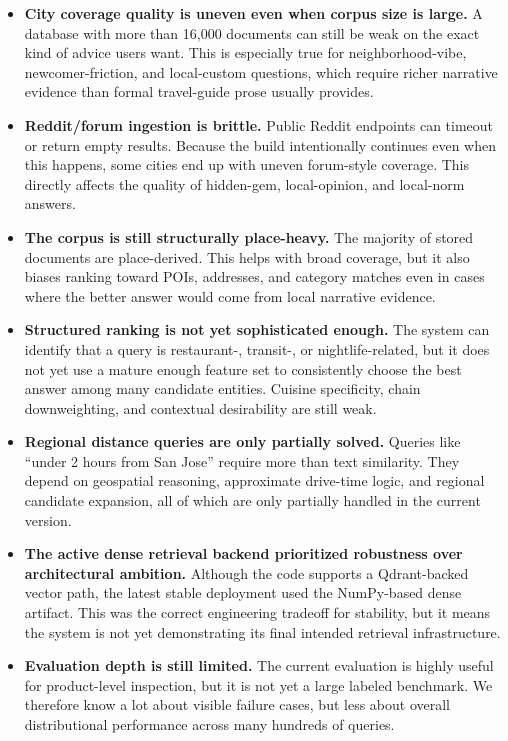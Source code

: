 \documentclass[11pt]{article}
\begin{document}
\begin{itemize}[leftmargin=*]
    \item \textbf{City coverage quality is uneven even when corpus size is large.} A database with more than 16,000 documents can still be weak on the exact kind of advice users want. This is especially true for neighborhood-vibe, newcomer-friction, and local-custom questions, which require richer narrative evidence than formal travel-guide prose usually provides.
    \item \textbf{Reddit/forum ingestion is brittle.} Public Reddit endpoints can timeout or return empty results. Because the build intentionally continues even when this happens, some cities end up with uneven forum-style coverage. This directly affects the quality of hidden-gem, local-opinion, and local-norm answers.
    \item \textbf{The corpus is still structurally place-heavy.} The majority of stored documents are place-derived. This helps with broad coverage, but it also biases ranking toward POIs, addresses, and category matches even in cases where the better answer would come from local narrative evidence.
    \item \textbf{Structured ranking is not yet sophisticated enough.} The system can identify that a query is restaurant-, transit-, or nightlife-related, but it does not yet use a mature enough feature set to consistently choose the best answer among many candidate entities. Cuisine specificity, chain downweighting, and contextual desirability are still weak.
    \item \textbf{Regional distance queries are only partially solved.} Queries like ``under 2 hours from San Jose'' require more than text similarity. They depend on geospatial reasoning, approximate drive-time logic, and regional candidate expansion, all of which are only partially handled in the current version.
    \item \textbf{The active dense retrieval backend prioritized robustness over architectural ambition.} Although the code supports a Qdrant-backed vector path, the latest stable deployment used the NumPy-based dense artifact. This was the correct engineering tradeoff for stability, but it means the system is not yet demonstrating its final intended retrieval infrastructure.
    \item \textbf{Evaluation depth is still limited.} The current evaluation is highly useful for product-level inspection, but it is not yet a large labeled benchmark. We therefore know a lot about visible failure cases, but less about overall distributional performance across many hundreds of queries.
\end{itemize}
\end{document}
